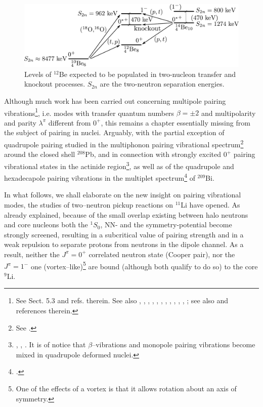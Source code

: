 \begin{subappendices}
\begin{figure}
\includegraphics[width=\textwidth]{C8/figsC8/figa4_newnew.pdf}
\caption{Levels of $^{12}$Be expected to be populated in two-nucleon transfer and knockout processes. $S_{2n}$ are the two-neutron separation energies.}\label{fig6.I.4}
\end{figure}




Although much work has been carried out concerning multipole pairing vibrations\footnote{See \cite{Brink:05} Sect. 5.3 and refs. therein. See also  \cite{Broglia:74}, \cite{Ragnarsson:76}, \cite{Broglia:71b}, \cite{Broglia:71c}, \cite{Bes:71d}, \cite{Bes:71}, \cite{Flynn:71}, \cite{Bes:72}, \cite{Broglia:81c}, \cite{Bohr:74b}, \cite{Flynn:72},  \cite{Bortignon:76}; see also \cite{Kubo:70} and references therein.}, i.e. modes with transfer quantum numbers $\beta=\pm2$ and multipolarity and parity $\lambda^\pi$ different from $0^+$, this remains a chapter essentially missing from the subject of pairing in nuclei. Arguably, with the partial exception of quadrupole pairing studied in the multiphonon pairing vibrational spectrum\footnote{See \cite{Flynn:72}.} around the closed shell $^{208}$Pb, and in connection with strongly excited $0^+$ pairing vibrational states in the actinide region\footnote{\cite{Casten:72}, \cite{Bes:72}, \cite{Ragnarsson:76}. It is of notice that $\beta$--vibrations and monopole pairing vibrations become mixed in quadrupole deformed nuclei.}, as well as of the quadrupole and hexadecapole pairing vibrations in the multiplet spectrum\footnote{\cite{Bortignon:76}.} of $^{209}$Bi.

In what follows, we shall elaborate on the new insight on pairing vibrational modes, the studies of two--neutron pickup reactions on $^{11}$Li have opened. As already explained, because of the small overlap existing between halo neutrons and core nucleons both the $^1S_0$, NN- and the symmetry-potential become strongly screened, resulting in a subcritical value of pairing strength and in a weak repulsion to separate protons from neutrons in the dipole channel.
As a result, neither the $J^{\pi}=0^+$ correlated neutron state  (Cooper pair), nor the $J^\pi=1^-$ one (vortex--like)\footnote{One of the effects of a vortex is that it allows rotation about an axis of symmetry.} are bound 
(although both qualify to do so) to the core $^{9}$Li. 



\end{subappendices}
